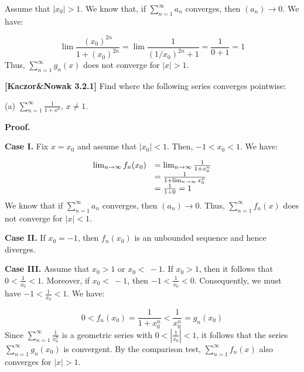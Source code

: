 \documentclass[10pt]{article}
\begin{document}
Assume that $\displaystyle |x_{0} | >1$. We know that, if $\displaystyle \sum _{n=1}^{\infty } a_{n}$ converges, then $\displaystyle ( a_{n})\rightarrow 0$. We have:


\begin{equation*}
\lim \frac{( x_{0})^{2n}}{1+( x_{0})^{2n}} =\lim \frac{1}{( 1/x_{0})^{2n} +1} =\frac{1}{0+1} =1
\end{equation*}
Thus, $\displaystyle \sum _{n=1}^{\infty } g_{n}( x)$ does not converge for $\displaystyle |x| >1$.



\textbf{[Kaczor\&Nowak 3.2.1]} Find where the following series converges pointwise:



(a) $\displaystyle \sum _{n=1}^{\infty }\frac{1}{1+x^{n}}$, $\displaystyle x\neq 1$.



\textbf{Proof.}



\textbf{Case I.} Fix $\displaystyle x=x_{0}$ and assume that $\displaystyle |x_{0} |< 1$. Then, $\displaystyle -1< x_{0} < 1$. We have:


\begin{equation*}
\begin{array}{ c l }
\lim _{n\rightarrow \infty } f_{n}( x_{0}) & =\lim _{n\rightarrow \infty }\frac{1}{1+x_{0}^{n}}\\
 & =\frac{1}{1+\lim _{n\rightarrow \infty } x_{0}^{n}}\\
 & =\frac{1}{1+0} =1
\end{array}
\end{equation*}
 We know that if $\displaystyle \sum _{n=1}^{\infty } a_{n}$ converges, then $\displaystyle ( a_{n})\rightarrow 0$. Thus, $\displaystyle \sum _{n=1}^{\infty } f_{n}( x)$ does not converge for $\displaystyle |x|< 1$. 



\textbf{Case II.} If $\displaystyle x_{0} =-1$, then $\displaystyle f_{n}( x_{0})$ is an unbounded sequence and hence diverges. 

\textbf{Case III.} Assume that $\displaystyle x_{0}  >1$ or $\displaystyle x_{0} < \ -1$. If $\displaystyle x_{0}  >1$, then it follows that $\displaystyle 0< \frac{1}{x_{0}} < 1$. Moreover, if $\displaystyle x_{0} < \ -1$, then $\displaystyle -1< \frac{1}{x_{0}} < 0$. Consequently, we must have $\displaystyle -1< \frac{1}{x_{0}} < 1$. We have:




\begin{equation*}
0< f_{n}( x_{0}) =\frac{1}{1+x_{0}^{n}} < \frac{1}{x_{0}^{n}} =g_{n}( x_{0})
\end{equation*}
 Since $\displaystyle \sum _{n=1}^{\infty }\frac{1}{x_{0}^{n}}$ is a geometric series with $\displaystyle 0< \left| \frac{1}{x_{0}}\right| < 1$, it follows that the series $\displaystyle \sum _{n=1}^{\infty } g_{n}( x_{0})$ is convergent. By the comparison test, $\displaystyle \sum _{n=1}^{\infty } f_{n}( x)$ also converges for $\displaystyle |x| >1$.
\end{document}
